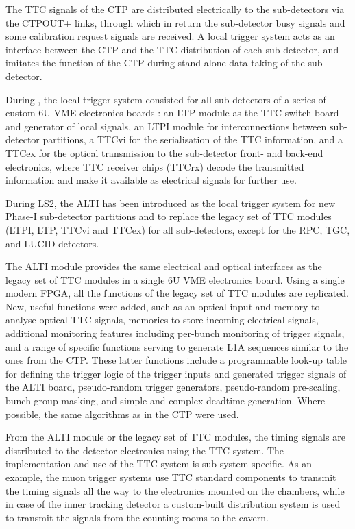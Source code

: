 \documentclass[cernpreprint, atlasdraft=false, UKenglish,british,orcidlogo, texmf, orcidlogo]{atlasdoc}
\begin{document}
The \gls{TTC} signals of the \gls{CTP} are distributed electrically to the sub-detectors via the \gls{CTPOUT+} links, through which in return the sub-detector busy signals and some calibration request signals are received.  A local trigger system acts as an interface between the \gls{CTP} and the \gls{TTC} distribution of each sub-detector, and imitates the function of the \gls{CTP} during stand-alone data taking of the sub-detector.
 
During \RunOneTwo, the local trigger system consisted for all sub-detectors of a series of custom 6U \gls{VME} electronics boards \cite{bib:ttc}: an \gls{LTP} module as the \gls{TTC} switch board and generator of local signals, an \gls{LTPI} module for interconnections between sub-detector partitions, a TTCvi for the serialisation of the \gls{TTC} information, and a TTCex for the optical transmission to the sub-detector front- and back-end electronics, where \gls{TTC} receiver chips (TTCrx) decode the transmitted information and make it available as electrical signals for further use.
 
During \gls{LS2}, the \gls{ALTI} has been introduced as the local trigger system for new Phase-I sub-detector partitions and to replace the legacy set of \gls{TTC} modules (\gls{LTPI}, \gls{LTP}, TTCvi and TTCex) for all sub-detectors, except for the \gls{RPC}, \gls{TGC}, and \gls{LUCID} detectors.
 
The \gls{ALTI} module provides the same electrical and optical interfaces as the legacy set of \gls{TTC} modules in a single 6U \gls{VME} electronics board.  Using a single modern \gls{FPGA}, all the functions of the legacy set of \gls{TTC} modules are replicated.  New, useful functions were added, such as an optical input and memory to analyse optical \gls{TTC} signals, memories to store incoming electrical signals, additional monitoring features including per-bunch monitoring of trigger signals, and a range of specific functions serving to generate \gls{L1A} sequences similar to the ones from the \gls{CTP}.  These latter functions include a programmable look-up table for defining the trigger logic of the trigger inputs and generated trigger signals of the \gls{ALTI} board, pseudo-random trigger generators, pseudo-random pre-scaling, bunch group masking, and simple and complex deadtime generation.  Where possible, the same algorithms as in the \gls{CTP} were used.
 
From the \gls{ALTI} module or the legacy set of \gls{TTC} modules, the timing signals are distributed to the detector electronics using the \gls{TTC} system.  The implementation and use of the \gls{TTC} system is sub-system specific.  As an example, the muon trigger systems use \gls{TTC} standard components to transmit the timing signals all the way to the electronics mounted on the chambers, while in case of the inner tracking detector a custom-built distribution system is used to transmit the signals from the counting rooms to the cavern.
 
\end{document}
